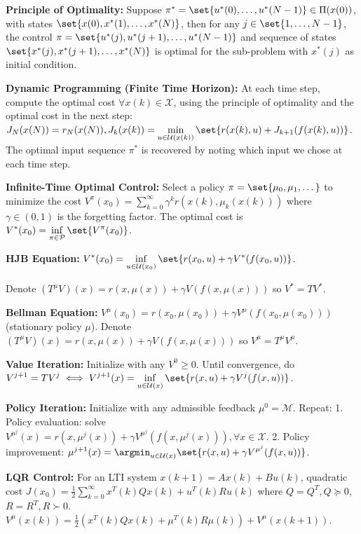 \documentclass[twocolumn, 8pt]{extarticle}
\begin{document}
\textbf{Principle of Optimality:} Suppose $\pi^* = \set{u^*(0), \dots, u^*(N - 1)} \in \Pi(x(0))$, with states
$\set{x(0), x^*(1), \dots, x^*(N)}$, then for any $j \in \set{1, \dots, N - 1}$, the control $\pi = \set{u^*(j), u^*(j +
1), \dots, u^*(N - 1)}$ and sequence of states $\set{x^*(j), x^*(j + 1), \dots, x^*(N)}$ is optimal for the sub-problem
with $x^*(j)$ as initial condition.

\textbf{Dynamic Programming (Finite Time Horizon):} At each time step, compute the optimal cost $\forall x(k) \in
\mathcal X$, using the principle of optimality and the optimal cost in the next step:
$J_N(x(N)) = r_N(x(N)), \displaystyle J_k(x(k)) = \min _{u \in \mathcal U(x(k))} \set{r(x(k), u) + J_{k + 1}(f(x(k), u))}$.
The optimal input sequence $\pi^*$ is recovered by noting which input we chose at each time step.

\textbf{Infinite-Time Optimal Control:} Select a policy \(\pi = \set{\mu _0, \mu _1, \dots}\) to minimize the cost
\(\displaystyle V^\pi(x_0) = \sum _{k = 0}^\infty \gamma^k r(x(k), \mu _k(x(k)))\) where \(\gamma \in (0, 1)\) is the
forgetting factor. The optimal cost is \(\displaystyle V^*(x_0) = \inf _{\pi \in \mathcal P} \set{V^\pi(x_0)}\).

\textbf{HJB Equation:} \(\displaystyle V^*(x_0) = \inf _{u \in \mathcal U(x_0)}\set{r(x_0, u) + \gamma V^*(f(x_0, u))}\).

Denote \((T^\mu V)(x) = r(x, \mu(x)) + \gamma V(f(x, \mu(x)))\) so \(V^* = TV^*\).

\textbf{Bellman Equation:} \(\displaystyle V^\mu(x_0) = r(x_0, \mu(x_0)) + \gamma V^\mu(f(x_0, \mu(x_0)))\) (stationary
policy $\mu$).
Denote \((T^\mu V)(x) = r(x, \mu(x)) + \gamma V(f(x, \mu(x)))\) so \(V^\mu = T^\mu V^\mu\).

\textbf{Value Iteration:} Initialize with any $V^0 \geq 0$. Until convergence, do
$\displaystyle V^{j + 1} = TV^j \iff V^{j + 1}(x) = \inf _{u \in \mathcal U(x)}\set{r(x, u) + \gamma V^j(f(x, u))}$.

\textbf{Policy Iteration:} Initialize with any admissible feedback $\mu^0 = \mathcal M$. Repeat:
1. Policy evaluation: solve $\displaystyle V^{\mu^j}(x) = r(x, \mu^j(x)) + \gamma V^{\mu^j}(f(x, \mu^j(x))), \forall x \in \mathcal X$.
2. Policy improvement: $\displaystyle \mu^{j + 1}(x) = \argmin _{u \in \mathcal U(x)} \set{r(x, u) + \gamma V^{\mu^j}(f(x, u))}$.

\textbf{LQR Control:} For an LTI system $x(k + 1) = Ax(k) + Bu(k)$, quadratic cost
$J(x_0) = \frac{1}{2}\sum _{k = 0}^\infty x^T(k)Qx(k) + u^T(k)Ru(k)$ where \(Q = Q^T, Q \succcurlyeq 0\),
\(R = R^T, R \succ 0\). \(\displaystyle V^\mu(x(k)) = \frac{1}{2}\left(x^T(k)Qx(k) + \mu^T(k)R\mu(k)\right) + V^\mu(x(k + 1))\).
\end{document}
